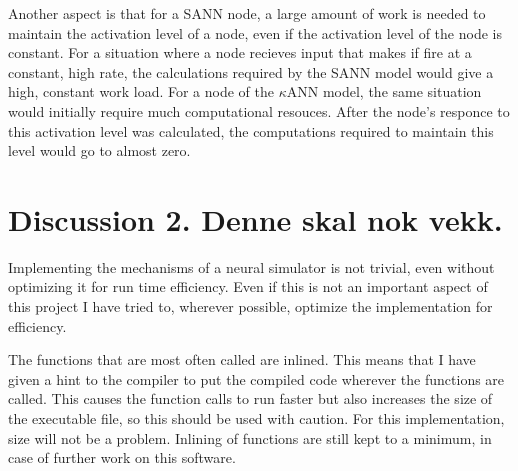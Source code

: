 Another aspect is that for a SANN node, a large amount of work is needed to maintain the activation level of a node, even if the activation level of the node is constant.
For a situation where a node recieves input that makes if fire at a constant, high rate, the calculations required by the SANN model would give a high, constant work load.
For a node of the $\kappa$ANN model, the same situation would initially require much computational resouces.
After the node's responce to this activation level was calculated, the computations required to maintain this level would go to almost zero.




\section{Discussion 2. Denne skal nok vekk.}


Implementing the mechanisms of a neural simulator is not trivial, even without optimizing it for run time efficiency.
Even if this is not an important aspect of this project I have tried to, wherever possible, optimize the implementation for efficiency.

The functions that are most often called are inlined. This means that I have given a hint to the compiler to put the compiled code wherever the functions are called.
This causes the function calls to run faster but also increases the size of the executable file, so this should be used with caution. %
For this implementation, size will not be a problem. %
Inlining of functions are still kept to a minimum, in case of further work on this software. %

